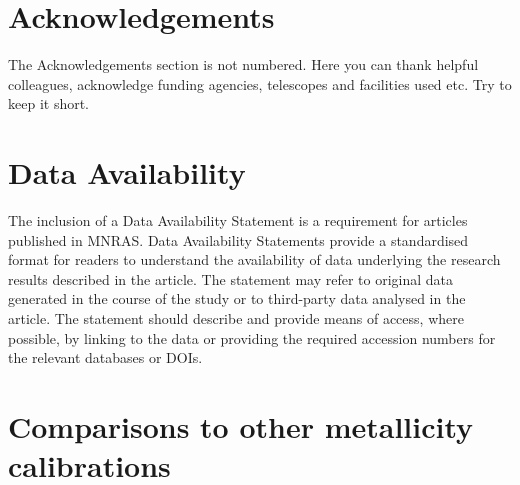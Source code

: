 \documentclass[fleqn,usenatbib]{mnras}
\begin{document}
\section*{Acknowledgements}
The Acknowledgements section is not numbered. Here you can thank helpful
colleagues, acknowledge funding agencies, telescopes and facilities used etc.
Try to keep it short.

\section*{Data Availability}

 
The inclusion of a Data Availability Statement is a requirement for articles published in MNRAS. Data Availability Statements provide a standardised format for readers to understand the availability of data underlying the research results described in the article. The statement may refer to original data generated in the course of the study or to third-party data analysed in the article. The statement should describe and provide means of access, where possible, by linking to the data or providing the required accession numbers for the relevant databases or DOIs.












\appendix

\section{Comparisons to other metallicity calibrations}
\label{sec:appendix_metallicities}
\end{document}
